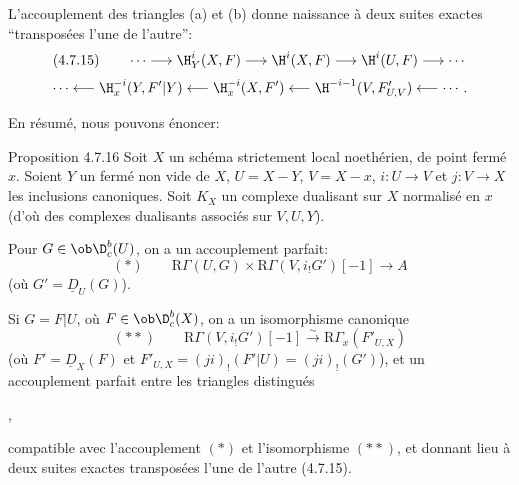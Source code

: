 L'accouplement des triangles (a) et (b) donne naissance à deux suites exactes ``transposées l'une de l'autre'':
\[
(4.7.15)\qquad \cdots\longrightarrow \H_Y^i(X,F)\longrightarrow\H^i(X,F)\longrightarrow\H^i(U,F)\longrightarrow\cdots
\]
\[
\cdots\longleftarrow \H_x^{-i}(Y,F'|Y)\longleftarrow\H_x^{-i}(X,F')\longleftarrow\H^{-i-1}(V,F'_{U,V})\longleftarrow\cdots.
\]

En résumé, nous pouvons énoncer:

\begin{statement}{Proposition 4.7.16}
Soit $X$ un schéma strictement local noethérien, de point fermé $x$. Soient $Y$ un fermé non vide de $X$, $U=X-Y$, $V=X-x$, $i:U\to V$ et $j:V\to X$ les inclusions canoniques. Soit $K_X$ un complexe dualisant sur $X$ normalisé en $x$ (d'où des complexes dualisants associés sur $V,U,Y$).

Pour $G\in\ob\D_c^b(U)$, on a un accouplement parfait:
\[
(*)\qquad \mathrm{R}\Gamma(U,G)\times\mathrm{R}\Gamma(V,i_!G')[-1]\longrightarrow A
\]
(où $G'=\underline{D}_U(G)$).

Si $G=F|U$, où $F\in\ob\D_c^b(X)$, on a un isomorphisme canonique
\[
(**)\qquad \mathrm{R}\Gamma(V,i_!G')[-1]\xrightarrow{\sim}\mathrm{R}\Gamma_x(F'_{U,X})
\]
(où $F'=\underline{D}_X(F)$ et $F'_{U,X}=(ji)_!(F'|U)=(ji)_!(G')$), et un accouplement parfait entre les triangles distingués
\begin{center}
\quad ,
\end{center}
compatible avec l'accouplement $(*)$ et l'isomorphisme $(**)$, et donnant lieu à deux suites exactes transposées l'une de l'autre (4.7.15).
\end{statement}

